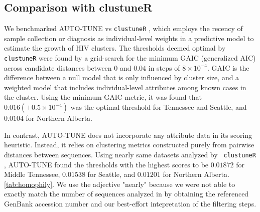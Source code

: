 \documentclass[utf8]{FrontiersinHarvard} %
\begin{document}


\subsection{Comparison with clustuneR}

We benchmarked AUTO-TUNE vs {\tt clustuneR} \cite{chato_public_2020}, which employs the recency of sample
collection or diagnosis as individual-level weights in a predictive model to
estimate the growth of HIV clusters. The thresholds deemed optimal by {\tt clustuneR} were found by a grid-search for the minimum GAIC (generalized AIC) across candidate distances between $0$ and $0.04$ in steps of $8 \times 10^{-4}$. GAIC
is the difference between a null model that is only influenced by cluster size,
and a weighted model that includes individual-level attributes among known
cases in the cluster. Using the minimum GAIC metric, it was found that $0.016 (\pm  0.5\times 10^{-4})$
was the optimal threshold for Tennessee and Seattle, and $0.0104$ for Northern
Alberta.

In contrast, AUTO-TUNE does not incorporate any attribute data in its scoring
heuristic. Instead, it relies on clustering metrics constructed purely from
pairwise distances between sequences. Using nearly same datasets analyzed by {\tt
clustuneR} \citep{chato_public_2020}, AUTO-TUNE found the thresholds with the
highest scores to be $0.01872$ for Middle Tennessee, $0.01538$ for Seattle, and
$0.01201$ for Northern Alberta. \autoref{tab:homophily}. We use the adjective "nearly" because we were not able to exactly match the number of sequences analyzed in \citet{chato_public_2020} by obtaining the referenced GenBank accession number and our best-effort intepretation of the filtering steps.
\end{document}

